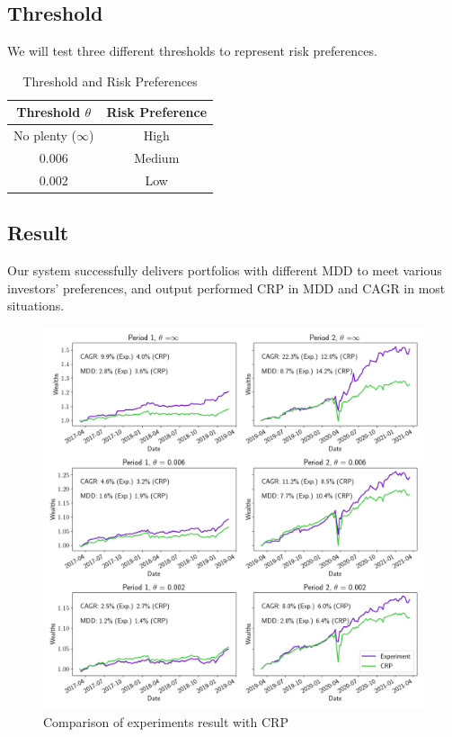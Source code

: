 \subsection{Threshold}
We will test three different thresholds to represent risk preferences.  
\begin{table}[htb]
    \centering
    \begin{tabular}{||c|c||}
    \hline \hline
    Threshold $\theta$ & Risk Preference \\ \hline
    No plenty ($\infty$) & High \\ \hline
    0.006 & Medium      \\ \hline
    0.002 & Low      \\ \hline \hline
    \end{tabular}
    \caption{Threshold and Risk Preferences}
    \label{tab:threshold}
\end{table}
\subsection{Result}
Our system successfully delivers portfolios with different MDD to meet various investors' preferences, and output performed CRP in MDD and CAGR in most situations.

\begin{figure}[htb]
\centering
  \includegraphics[width=16cm]{images/crp_compare.png}
  \caption [Comparison of experiments result with CRP]{Comparison of experiments result with CRP}
  \label{fig:crp_compare}
\end{figure}